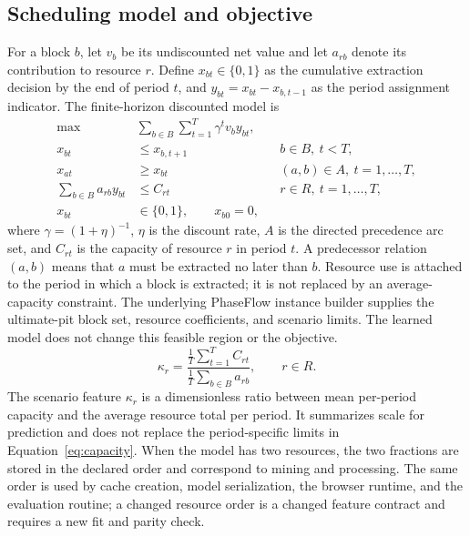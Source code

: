 \documentclass[11pt]{article}
\begin{document}
\subsection{Scheduling model and objective}
For a block $b$, let $v_b$ be its undiscounted net value and let $a_{rb}$ denote its contribution to resource $r$. Define $x_{bt}\in\{0,1\}$ as the cumulative extraction decision by the end of period $t$, and $y_{bt}=x_{bt}-x_{b,t-1}$ as the period assignment indicator. The finite-horizon discounted model is
\begin{align}
\max \quad & \sum_{b\in B}\sum_{t=1}^{T}\gamma^t v_b y_{bt},\label{eq:npv}\\
x_{bt} &\leq x_{b,t+1} && b\in B,\ t<T,\label{eq:monotone}\\
x_{at} &\geq x_{bt} && (a,b)\in A,\ t=1,\ldots,T,\label{eq:precedence}\\
\sum_{b\in B} a_{rb}y_{bt} &\leq C_{rt} && r\in R,\ t=1,\ldots,T,\label{eq:capacity}\\
x_{bt} &\in\{0,1\},\qquad x_{b0}=0,\label{eq:binary}
\end{align}
where $\gamma=(1+\eta)^{-1}$, $\eta$ is the discount rate, $A$ is the directed precedence arc set, and $C_{rt}$ is the capacity of resource $r$ in period $t$. A predecessor relation $(a,b)$ means that $a$ must be extracted no later than $b$. Resource use is attached to the period in which a block is extracted; it is not replaced by an average-capacity constraint. The underlying PhaseFlow instance builder supplies the ultimate-pit block set, resource coefficients, and scenario limits. The learned model does not change this feasible region or the objective.
\begin{equation}
\kappa_r=\frac{\frac{1}{T}\sum_{t=1}^{T}C_{rt}}{\frac{1}{T}\sum_{b\in B}a_{rb}},\qquad r\in R.
\label{eq:capacity-fraction}
\end{equation}
The scenario feature $\kappa_r$ is a dimensionless ratio between mean per-period capacity and the average resource total per period. It summarizes scale for prediction and does not replace the period-specific limits in Equation~\ref{eq:capacity}. When the model has two resources, the two fractions are stored in the declared order and correspond to mining and processing. The same order is used by cache creation, model serialization, the browser runtime, and the evaluation routine; a changed resource order is a changed feature contract and requires a new fit and parity check.
\end{document}
